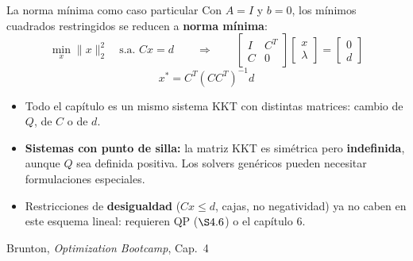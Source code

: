 \documentclass[10pt,aspectratio=169]{beamer}
\newcommand{\fuente}{\vfill{\scriptsize\color{gray}Brunton, \emph{Optimization Bootcamp}, Cap.~4}}
\begin{document}
\begin{frame}{La norma mínima como caso particular}
  \small
  Con $A=I$ y $b=0$, los mínimos cuadrados restringidos se reducen a
  \textbf{norma mínima}:
  \[
    \min_x \|x\|_2^2 \quad\text{s.a. } Cx=d
    \qquad\Longrightarrow\qquad
    \begin{bmatrix} I & C^T \\ C & 0 \end{bmatrix}
    \begin{bmatrix} x \\ \lambda \end{bmatrix}
    =
    \begin{bmatrix} 0 \\ d \end{bmatrix} \tag{4.50}
  \]
  \[
    x^* = C^T(CC^T)^{-1}d
  \]

  \vspace{1mm}
  \begin{itemize}
    \item Todo el capítulo es un mismo sistema KKT con distintas matrices:
      cambio de $Q$, de $C$ o de $d$.
    \item \textbf{Sistemas con punto de silla:} la matriz KKT es simétrica pero
      \textbf{indefinida}, aunque $Q$ sea definida positiva. Los solvers
      genéricos pueden necesitar formulaciones especiales.
    \item Restricciones de \textbf{desigualdad} ($Cx \le d$, cajas, no
      negatividad) ya no caben en este esquema lineal: requieren QP ($\S4{.}6$)
      o el capítulo 6.
  \end{itemize}
  \fuente
\end{frame}
\end{document}

